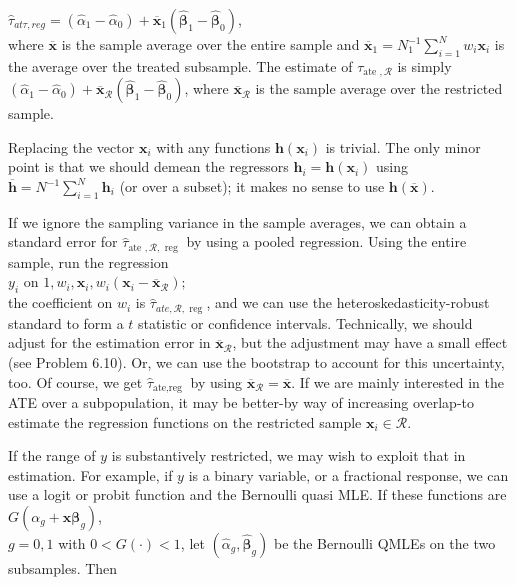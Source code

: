 \documentclass[10pt]{article}
\begin{document}
$\hat{\tau}_{a t \tau, r e g}=\left(\hat{\alpha}_{1}-\hat{\alpha}_{0}\right)+\overline{\mathbf{x}}_{1}\left(\hat{\boldsymbol{\beta}}_{1}-\hat{\boldsymbol{\beta}}_{0}\right)$,\\
where $\overline{\mathbf{x}}$ is the sample average over the entire sample and $\overline{\mathbf{x}}_{1}=N_{1}^{-1} \sum_{i=1}^{N} w_{i} \mathbf{x}_{i}$ is the average over the treated subsample. The estimate of $\tau_{\text {ate }, \mathscr{R}}$ is simply $\left(\hat{\alpha}_{1}-\hat{\alpha}_{0}\right)+ \overline{\mathbf{x}}_{\mathscr{R}}\left(\hat{\boldsymbol{\beta}}_{1}-\hat{\boldsymbol{\beta}}_{0}\right)$, where $\overline{\mathbf{x}}_{\mathscr{R}}$ is the sample average over the restricted sample.

Replacing the vector $\mathbf{x}_{i}$ with any functions $\mathbf{h}\left(\mathbf{x}_{i}\right)$ is trivial. The only minor point is that we should demean the regressors $\mathbf{h}_{i}=\mathbf{h}\left(\mathbf{x}_{i}\right)$ using $\overline{\mathbf{h}}=N^{-1} \sum_{i=1}^{N} \mathbf{h}_{i}$ (or over a subset); it makes no sense to use $\mathbf{h}(\overline{\mathbf{x}})$.

If we ignore the sampling variance in the sample averages, we can obtain a standard error for $\hat{\tau}_{\text {ate }, \mathscr{R}, \text { reg }}$ by using a pooled regression. Using the entire sample, run the regression\\
$y_{i}$ on $1, w_{i}, \mathbf{x}_{i}, w_{i}\left(\mathbf{x}_{i}-\overline{\mathbf{x}}_{\mathscr{R}}\right) ;$\\
the coefficient on $w_{i}$ is $\hat{\tau}_{a t e, \mathscr{R}, \text { reg }}$, and we can use the heteroskedasticity-robust standard to form a $t$ statistic or confidence intervals. Technically, we should adjust for the estimation error in $\overline{\mathbf{x}}_{\mathscr{R}}$, but the adjustment may have a small effect (see Problem 6.10). Or, we can use the bootstrap to account for this uncertainty, too. Of course, we get $\hat{\tau}_{\text {ate,reg }}$ by using $\overline{\mathbf{x}}_{\mathscr{R}}=\overline{\mathbf{x}}$. If we are mainly interested in the ATE over a subpopulation, it may be better-by way of increasing overlap-to estimate the regression functions on the restricted sample $\mathbf{x}_{i} \in \mathscr{R}$.

If the range of $y$ is substantively restricted, we may wish to exploit that in estimation. For example, if $y$ is a binary variable, or a fractional response, we can use a logit or probit function and the Bernoulli quasi MLE. If these functions are $G\left(\alpha_{g}+\mathbf{x} \boldsymbol{\beta}_{g}\right)$,\\
$g=0,1$ with $0<G(\cdot)<1$, let $\left(\hat{\alpha}_{g}, \hat{\boldsymbol{\beta}}_{g}\right)$ be the Bernoulli QMLEs on the two subsamples. Then
\end{document}
